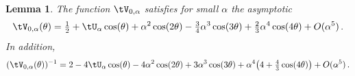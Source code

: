 \documentclass[a4paper,reqno,10pt]{article}
\newtheorem{lem}{Lemma}[section]
\begin{document}
\begin{lem}\label{speed.V.expan}
	The function $\tV_{0,\alpha}$ 
	satisfies for small $\alpha$ the asymptotic
	\begin{equation}
	\tV_{0,\alpha}(\theta)= \tfrac12 + \tU_{\alpha}\cos(\theta) +\alpha^2\cos(2\theta) -\tfrac34 \alpha^3 \cos(3\theta)  + \tfrac{2}{3}\alpha^4\cos(4\theta)  + O(\alpha^5) \,. \label{speed.expand}
	\end{equation}
    In addition,
	\begin{align}
	 (\tV_{0,\alpha}(\theta))^{-1} 
    = 2 -4 \tU_{\alpha} \cos(\theta) -4\alpha^2 \cos(2\theta)  + 3 \alpha^3 \cos(3\theta) +\alpha^4 \big( 4 +\tfrac{4}{3} \cos(4\theta)  \big) + O(\alpha^5) \,.\label{inv.speed.expan}
	\end{align}
\end{lem}
\end{document}
